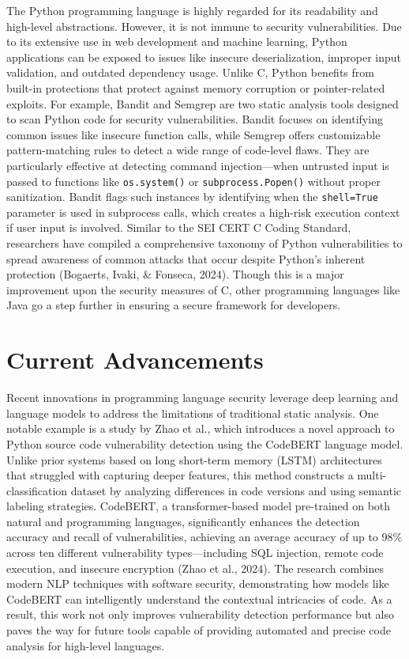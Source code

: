 \documentclass[11pt]{article}
\begin{document}
The Python programming language is highly regarded for its readability and high-level abstractions. However, it is not immune to security vulnerabilities. Due to its extensive use in web development and machine learning, Python applications can be exposed to issues like insecure deserialization, improper input validation, and outdated dependency usage. Unlike C, Python benefits from built-in protections that protect against memory corruption or pointer-related exploits. For example, Bandit and Semgrep are two static analysis tools designed to scan Python code for security vulnerabilities. Bandit focuses on identifying common issues like insecure function calls, while Semgrep offers customizable pattern-matching rules to detect a wide range of code-level flaws. They are particularly effective at detecting command injection—when untrusted input is passed to functions like \texttt{os.system()} or \texttt{subprocess.Popen()} without proper sanitization. Bandit flags such instances by identifying when the \texttt{shell=True} parameter is used in subprocess calls, which creates a high-risk execution context if user input is involved. Similar to the SEI CERT C Coding Standard, researchers have compiled a comprehensive taxonomy of Python vulnerabilities to spread awareness of common attacks that occur despite Python’s inherent protection (Bogaerts, Ivaki, \& Fonseca, 2024). Though this is a major improvement upon the security measures of C, other programming languages like Java go a step further in ensuring a secure framework for developers.

\section*{Current Advancements}

Recent innovations in programming language security leverage deep learning and language models to address the limitations of traditional static analysis. One notable example is a study by Zhao et al., which introduces a novel approach to Python source code vulnerability detection using the CodeBERT language model. Unlike prior systems based on long short-term memory (LSTM) architectures that struggled with capturing deeper features, this method constructs a multi-classification dataset by analyzing differences in code versions and using semantic labeling strategies. CodeBERT, a transformer-based model pre-trained on both natural and programming languages, significantly enhances the detection accuracy and recall of vulnerabilities, achieving an average accuracy of up to 98\% across ten different vulnerability types—including SQL injection, remote code execution, and insecure encryption (Zhao et al., 2024). The research combines modern NLP techniques with software security, demonstrating how models like CodeBERT can intelligently understand the contextual intricacies of code. As a result, this work not only improves vulnerability detection performance but also paves the way for future tools capable of providing automated and precise code analysis for high-level languages.
\end{document}
